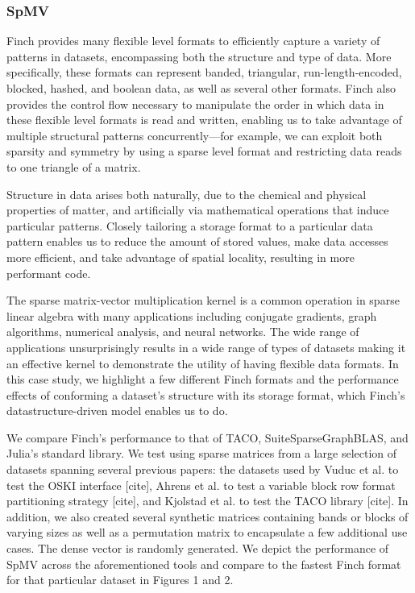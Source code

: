 \documentclass[acmsmall]{acmart}
\begin{document}
\subsubsection{SpMV}
Finch provides many flexible level formats to efficiently capture a variety of patterns in datasets, encompassing both the structure and type of data. More specifically, these formats can represent banded, triangular, run-length-encoded, blocked, hashed, and boolean data, as well as several other formats. Finch also provides the control flow necessary to manipulate the order in which data in these flexible level formats is read and written, enabling us to take advantage of multiple structural patterns concurrently—for example, we can exploit both sparsity and symmetry by using a sparse level format and restricting data reads to one triangle of a matrix. %

Structure in data arises both naturally, due to the chemical and physical properties of matter, and artificially via mathematical operations that induce particular patterns. Closely tailoring a storage format to a particular data pattern enables us to reduce the amount of stored values, make data accesses more efficient, and take advantage of spatial locality, resulting in more performant code.

The sparse matrix-vector multiplication kernel is a common operation in sparse linear algebra with many applications including conjugate gradients, graph algorithms, numerical analysis, and neural networks. The wide range of applications unsurprisingly results in a wide range of types of datasets making it an effective kernel to demonstrate the utility of having flexible data formats. In this case study, we highlight a few different Finch formats and the performance effects of conforming a dataset’s structure with its storage format, which Finch's datastructure-driven model enables us to do.

We compare Finch’s performance to that of TACO, SuiteSparseGraphBLAS, and Julia’s standard library.  We test using sparse matrices from a large selection of datasets spanning several previous papers: the datasets used by Vuduc et al. to test the OSKI interface [cite], Ahrens et al. to test a variable block row format partitioning strategy [cite], and Kjolstad et al. to test the TACO library [cite]. In addition, we also created several synthetic matrices containing bands or blocks of varying sizes as well as a permutation matrix to encapsulate a few additional use cases. The dense vector is randomly generated. We depict the performance of SpMV across the aforementioned tools and compare to the fastest Finch format for that particular dataset in Figures 1 and 2. 
\end{document}
